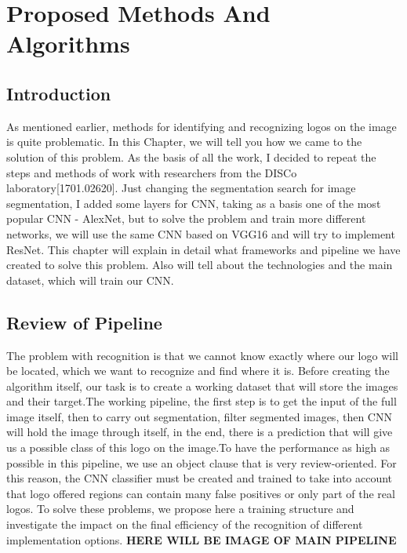 \chapter{Proposed Methods And Algorithms}\label{ch:D}
\section{Introduction}\label{sec:4.1}
\par As mentioned earlier, methods for identifying and recognizing logos on the image is quite problematic. In this Chapter, we will tell you how we came to the solution of this problem. As the basis of all the work, I decided to repeat the steps and methods of work with researchers from the DISCo laboratory[1701.02620]. Just changing the segmentation search for image segmentation, I added some layers for CNN, taking as a basis one of the most popular CNN - AlexNet, but to solve the problem and train more different networks, we will use the same CNN based on VGG16 and will try to implement ResNet. This chapter will explain in detail what frameworks and pipeline we have created to solve this problem. Also will tell about the technologies and the main dataset, which will train our CNN. 

\section{Review of Pipeline}\label{sec:4.2}
\par The problem with recognition is that we cannot know exactly where our logo will be located, which we want to recognize and find where it is. Before creating the algorithm itself, our task is to create a working dataset that will store the images and their target.The working pipeline, the first step is to get the input of the full image itself, then to carry out segmentation, filter segmented images, then CNN will hold the image through itself, in the end, there is a prediction that will give us a possible class of this logo on the image.To have the performance as high as possible in this pipeline, we use an object clause that is very review-oriented. For this reason, the CNN classifier must be created and trained to take into account that logo offered regions can contain many false positives or only part of the real logos. To solve these problems, we propose here a training structure and investigate the impact on the final efficiency of the recognition of different implementation options. \textbf{HERE WILL BE IMAGE OF MAIN PIPELINE}


